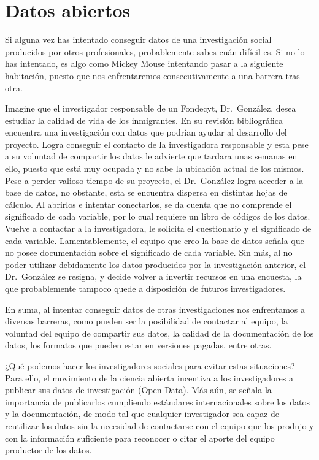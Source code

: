 \documentclass[
  spanish,
  letterpaper,
  DIV=11,
  numbers=noendperiod]{scrreprt}
\begin{document}

\chapter{Datos abiertos}\label{datos-abiertos}

Si alguna vez has intentado conseguir datos de una investigación social
producidos por otros profesionales, probablemente sabes cuán difícil es.
Si no lo has intentado, es algo como Mickey Mouse intentando pasar a la
siguiente habitación, puesto que nos enfrentaremos consecutivamente a
una barrera tras otra.

Imagine que el investigador responsable de un Fondecyt, Dr.~González,
desea estudiar la calidad de vida de los inmigrantes. En su revisión
bibliográfica encuentra una investigación con datos que podrían ayudar
al desarrollo del proyecto. Logra conseguir el contacto de la
investigadora responsable y esta pese a su voluntad de compartir los
datos le advierte que tardara unas semanas en ello, puesto que está muy
ocupada y no sabe la ubicación actual de los mismos. Pese a perder
valioso tiempo de su proyecto, el Dr.~González logra acceder a la base
de datos, no obstante, esta se encuentra dispersa en distintas hojas de
cálculo. Al abrirlos e intentar conectarlos, se da cuenta que no
comprende el significado de cada variable, por lo cual requiere un libro
de códigos de los datos. Vuelve a contactar a la investigadora, le
solicita el cuestionario y el significado de cada variable.
Lamentablemente, el equipo que creo la base de datos señala que no posee
documentación sobre el significado de cada variable. Sin más, al no
poder utilizar debidamente los datos producidos por la investigación
anterior, el Dr.~González se resigna, y decide volver a invertir
recursos en una encuesta, la que probablemente tampoco quede a
disposición de futuros investigadores.

En suma, al intentar conseguir datos de otras investigaciones nos
enfrentamos a diversas barreras, como pueden ser la posibilidad de
contactar al equipo, la voluntad del equipo de compartir sus datos, la
calidad de la documentación de los datos, los formatos que pueden estar
en versiones pagadas, entre otras.

¿Qué podemos hacer los investigadores sociales para evitar estas
situaciones? Para ello, el movimiento de la ciencia abierta incentiva a
los investigadores a publicar sus datos de investigación (Open Data).
Más aún, se señala la importancia de publicarlos cumpliendo estándares
internacionales sobre los datos y la documentación, de modo tal que
cualquier investigador sea capaz de reutilizar los datos sin la
necesidad de contactarse con el equipo que los produjo y con la
información suficiente para reconocer o citar el aporte del equipo
productor de los datos.
\end{document}
